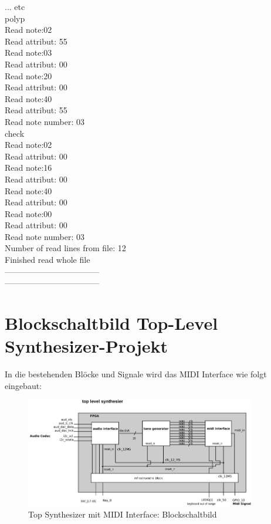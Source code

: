 ... etc \\

polyp\\
Read note:02\\
Read attribut: 55\\
Read note:03\\
Read attribut: 00\\
Read note:20\\
Read attribut: 00\\
Read note:40\\
Read attribut: 55\\
Read note number: 03\\

check\\
Read note:02\\
Read attribut: 00\\
Read note:16\\
Read attribut: 00\\
Read note:40\\
Read attribut: 00\\
Read note:00\\
Read attribut: 00\\
Read note number: 03\\

Number of read lines from file: 12\\
Finished read whole file\\
-----------------------------------\\
-----------------------------------\\


\chapter{Blockschaltbild Top-Level Synthesizer-Projekt}\label{chap.anhang_top_synthesizer}

In die bestehenden Blöcke und Signale wird das MIDI Interface wie folgt eingebaut:

\begin{figure}[H]
	\includegraphics[width=0.9\textwidth]{images/midi_interface/top_synthesizer_block_saled.png}
	\caption{Top Synthesizer mit MIDI Interface: Blockschaltbild}
	\label{fig.top_synthesizer_block}
\end{figure}

